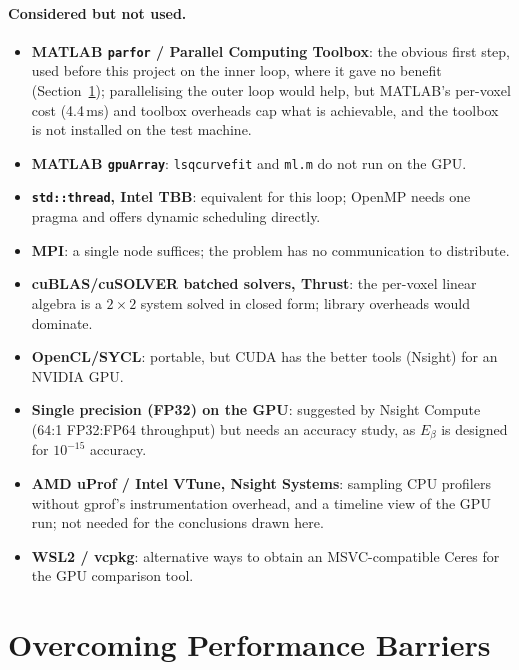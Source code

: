 \documentclass[11pt]{article}
\begin{document}
\paragraph{Considered but not used.}
\begin{itemize}
    \item \textbf{MATLAB \texttt{parfor} / Parallel Computing Toolbox}: the obvious first step,
        used before this project on the inner loop, where it gave no benefit
        (Section~\ref{sec:barriers}); parallelising the outer loop would help, but MATLAB's
        per-voxel cost (4.4\,ms) and toolbox overheads cap what is achievable, and the toolbox
        is not installed on the test machine.
    \item \textbf{MATLAB \texttt{gpuArray}}: \texttt{lsqcurvefit} and \texttt{ml.m} do not run
        on the GPU.
    \item \textbf{\texttt{std::thread}, Intel TBB}: equivalent for this loop; OpenMP needs one
        pragma and offers dynamic scheduling directly.
    \item \textbf{MPI}: a single node suffices; the problem has no communication to distribute.
    \item \textbf{cuBLAS/cuSOLVER batched solvers, Thrust}: the per-voxel linear algebra is a
        $2\times2$ system solved in closed form; library overheads would dominate.
    \item \textbf{OpenCL/SYCL}: portable, but CUDA has the better tools (Nsight) for an NVIDIA GPU.
    \item \textbf{Single precision (FP32) on the GPU}: suggested by Nsight Compute (64:1 FP32:FP64
        throughput) but needs an accuracy study, as $E_\beta$ is designed for $10^{-15}$ accuracy.
    \item \textbf{AMD uProf / Intel VTune, Nsight Systems}: sampling CPU profilers without gprof's
        instrumentation overhead, and a timeline view of the GPU run; not needed for the
        conclusions drawn here.
    \item \textbf{WSL2 / vcpkg}: alternative ways to obtain an MSVC-compatible Ceres for the
        GPU comparison tool.
\end{itemize}

\section{Overcoming Performance Barriers}
\label{sec:barriers}
\end{document}
